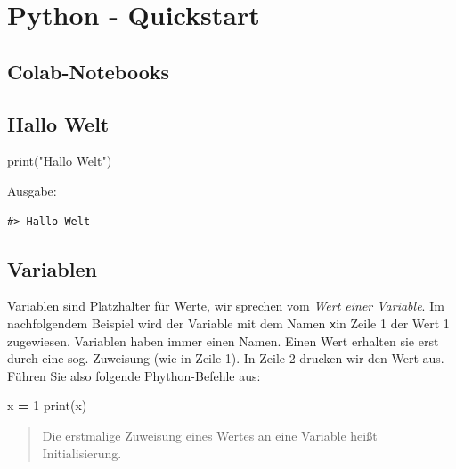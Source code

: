 \documentclass[
  oneside]{book}
\newenvironment{Shaded}{\begin{snugshade}}{\end{snugshade}}
\newcommand{\BuiltInTok}[1]{#1}
\newcommand{\DecValTok}[1]{\textcolor[rgb]{0.00,0.00,0.81}{#1}}
\newcommand{\NormalTok}[1]{#1}
\newcommand{\OperatorTok}[1]{\textcolor[rgb]{0.81,0.36,0.00}{\textbf{#1}}}
\newcommand{\StringTok}[1]{\textcolor[rgb]{0.31,0.60,0.02}{#1}}
\begin{document}
\hypertarget{python---quickstart}{%
\chapter{Python - Quickstart}\label{python---quickstart}}

\hypertarget{colab-notebooks}{%
\section{Colab-Notebooks}\label{colab-notebooks}}

\hypertarget{hallo-welt}{%
\section{Hallo Welt}\label{hallo-welt}}

\begin{Shaded}
\begin{Highlighting}[]
\BuiltInTok{print}\NormalTok{(}\StringTok{"Hallo Welt"}\NormalTok{)}
\end{Highlighting}
\end{Shaded}

Ausgabe:

\begin{verbatim}
#> Hallo Welt
\end{verbatim}

\hypertarget{variablen}{%
\section{Variablen}\label{variablen}}

Variablen sind Platzhalter für Werte, wir sprechen vom \emph{Wert einer Variable}. Im nachfolgendem Beispiel wird der Variable mit dem Namen \texttt{x}in Zeile 1 der Wert 1 zugewiesen. Variablen haben immer einen Namen. Einen Wert erhalten sie erst durch eine sog. Zuweisung (wie in Zeile 1). In Zeile 2 drucken wir den Wert aus. Führen Sie also folgende Phython-Befehle aus:

\begin{Shaded}
\begin{Highlighting}[]
\NormalTok{x }\OperatorTok{=} \DecValTok{1}
\BuiltInTok{print}\NormalTok{(x)}
\end{Highlighting}
\end{Shaded}

\begin{quote}
Die erstmalige Zuweisung eines Wertes an eine Variable heißt Initialisierung.
\end{quote}
\end{document}
